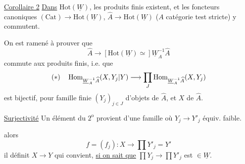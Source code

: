 \uline{Corollaire 2} \uline{Dans} $\mathrm{Hot}(\underline W)$, les produits finis existent, et les foncteurs canoniques $(\mathrm{Cat})\longrightarrow\mathrm{Hot}(\underline W)$, $\widehat A\longrightarrow\mathrm{Hot}(\underline W)$ ($A$ catégorie test stricte) y commutent.


On est ramené à prouver que
\[
\widehat A\longrightarrow[\mathrm{Hot}(\underline W)\simeq]\underline W_A^{-1}\widehat A
\]
commute aux produits finis, i.e. que
\[
(*)\quad\operatorname{Hom}_{\underline W_A^{-1}\widehat A}(X,Y_j|Y)\longrightarrow\prod_J\operatorname{Hom}_{\underline W_A^{-1}\widehat A}(X,Y_j)
\]
est bijectif, pour  famille finie $(Y_j)_{j\in J}$ d'objets de $\widehat A$, et $X$ de $\widehat A$.


\uline{Surjectivité} Un élément du $2^{\mathrm o}$  provient d'une famille
où $Y_j\longrightarrow Y'_j$ équiv. faible.

 alors
\[
f=(f_j):X\longrightarrow\prod Y'_j=Y'
\]
il définit $X\longrightarrow Y$ qui convient, \uline{si on sait que} $\prod Y_j\longrightarrow\prod Y'_j$ est $\in\underline W$.

